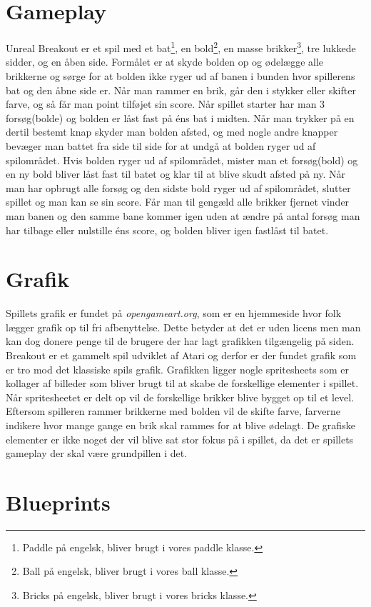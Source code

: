 
\section{Gameplay}
Unreal Breakout er et spil med et bat\footnote{Paddle på engelsk, bliver brugt i vores paddle klasse.}, en bold\footnote{Ball på engelsk, bliver brugt i vores ball klasse.}, en masse brikker\footnote{Bricks på engelsk, bliver brugt i vores bricks klasse.}, tre lukkede sidder, og en åben side. Formålet er at skyde bolden op og ødelægge alle brikkerne og sørge for at bolden ikke ryger ud af banen i bunden hvor spillerens bat og den åbne side er. Når man rammer en brik, går den i stykker eller skifter farve, og så får man point tilføjet sin score. Når spillet starter har man 3 forsøg(bolde) og bolden er låst fast på éns bat i midten. Når man trykker på en dertil bestemt knap skyder man bolden afsted, og med nogle andre knapper bevæger man battet fra side til side for at undgå at bolden ryger ud af spilområdet. Hvis bolden ryger ud af spilområdet, mister man et forsøg(bold) og en ny bold bliver låst fast til batet og klar til at blive skudt afsted på ny. Når man har opbrugt alle forsøg og den sidste bold ryger ud af spilområdet, slutter spillet og man kan se sin score. Får man til gengæld alle brikker fjernet vinder man banen og den samme bane kommer igen uden at ændre på antal forsøg man har tilbage eller nulstille éns score, og bolden bliver igen fastlåst til batet.

\section{Grafik}

Spillets grafik er fundet på \textit{opengameart.org}, som er en hjemmeside hvor folk lægger grafik op til fri afbenyttelse. Dette betyder at det er uden licens men man kan dog donere penge til de brugere der har lagt grafikken tilgængelig på siden. \newline
Breakout er et gammelt spil udviklet af Atari og derfor er der fundet grafik som er tro mod det klassiske spils grafik. Grafikken ligger nogle spritesheets som er kollager af billeder som bliver brugt til at skabe de forskellige elementer i spillet. Når spritesheetet er delt op vil de forskellige brikker blive bygget op til et level. Eftersom spilleren rammer brikkerne med bolden vil de skifte farve, farverne indikere hvor mange gange en brik skal rammes for at blive ødelagt. De grafiske elementer er ikke noget der vil blive sat stor fokus på i spillet, da det er spillets gameplay der skal være grundpillen i det. 
\section{Blueprints}